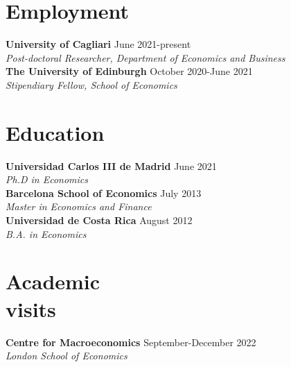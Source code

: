 \documentclass[margin]{res} %
\begin{document}
\begin{resume}

 
\section{Employment}
{\bf University of Cagliari} \hfill June 2021-present  \\
{\sl Post-doctoral Researcher, Department of Economics and Business} \\
{\bf The University of Edinburgh} \hfill October 2020-June 2021  \\
{\sl Stipendiary Fellow, School of Economics} 


\section{Education}
{\bf Universidad Carlos III de Madrid} \hfill June 2021  \\
{\sl Ph.D in Economics} \\
{\bf Barcelona School of Economics} \hfill July 2013 \\
{\sl Master in Economics and Finance}  \\
{\bf Universidad de Costa Rica} \hfill August 2012 \\
{\sl B.A. in Economics}

\section{Academic \\ visits}
{\bf Centre for Macroeconomics} \hfill September-December 2022  \\
{\sl London School of Economics}


\end{resume}
\end{document}
